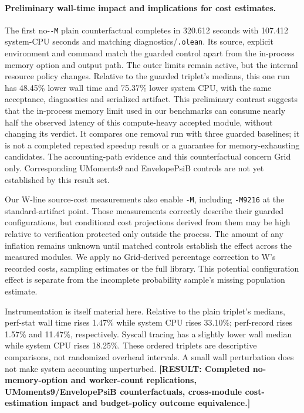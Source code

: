 \documentclass[10pt,twocolumn]{article}
\newcommand{\missing}[1]{\textbf{[RESULT: #1]}}
\begin{document}
\paragraph{Preliminary wall-time impact and implications for cost estimates.}
The first no-\texttt{-M} plain counterfactual completes in 320.612 seconds
with 107.412 system-CPU seconds and matching diagnostics/\texttt{.olean}.
Its source, explicit environment and command match the guarded control
apart from the in-process memory option and output path.
The outer limits remain active, but the internal resource policy changes.
Relative to the guarded triplet's medians, this one run has 48.45\%
lower wall time and 75.37\% lower system CPU, with the same acceptance,
diagnostics and serialized artifact.
This preliminary contrast suggests that the in-process memory limit used
in our benchmarks can consume nearly half the observed latency of this
compute-heavy accepted module, without changing its verdict.
It compares one removal run with three guarded baselines; it is not a
completed repeated speedup result or a guarantee for memory-exhausting
candidates. The accounting-path evidence and this counterfactual concern
Grid only. Corresponding UMoments9 and EnvelopePsiB controls are not yet
established by this result set.

Our W-line source-cost measurements also enable \texttt{-M}, including
\texttt{-M9216} at the standard-artifact point.
Those measurements correctly describe their guarded configurations, but
conditional cost projections derived from them may be high relative to
verification protected only outside the process.
The amount of any inflation remains unknown until matched controls
establish the effect across the measured modules.
We apply no Grid-derived percentage correction to W's recorded costs,
sampling estimates or the full library.
This potential configuration effect is separate from the incomplete
probability sample's missing population estimate.

Instrumentation is itself material here. Relative to the plain triplet's
medians, perf-stat wall time rises 1.47\% while system CPU rises 33.10\%;
perf-record rises 1.57\% and 11.47\%, respectively.
Syscall tracing has a slightly lower wall median while system CPU rises
18.25\%. These ordered triplets are descriptive comparisons, not randomized
overhead intervals. A small wall perturbation does not make system
accounting unperturbed.
\missing{Completed no-memory-option and worker-count replications,
UMoments9/EnvelopePsiB counterfactuals, cross-module cost-estimation impact
and budget-policy outcome equivalence.}
\end{document}

